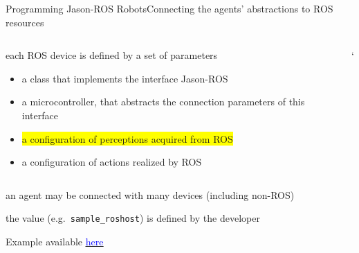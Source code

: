 \documentclass[compress]{beamer}
\newcommand{\link}[2]{\href{#1}{\underline{\textcolor{blue}{#2}}}}
\begin{document}
\begin{frame}[fragile]{Programming Jason-ROS Robots}{Connecting the agents' abstractions to ROS resources}
\begin{columns}
\begin{column}{.55\textwidth}
            each ROS device is defined by a set of parameters
            \begin{itemize}\tiny
                \item a class that implements the interface Jason-ROS
                \item a microcontroller, that abstracts the connection parameters of this interface
                \item\colorbox{yellow}{a configuration of perceptions acquired from ROS}
                \item a configuration of actions realized by ROS
            \end{itemize}
        \end{column}`      
    \end{columns}
  
  
    \vspace{.3cm}
  
    an agent may be connected with many devices {\tiny (including non-ROS)}\\ \vspace{-.2cm}
  
    the value (e.g.~\texttt{sample\_roshost}) is defined by the developer
    
    
     \vfill
    {\tiny Example available \link{https://github.com/issia-2026-jason-ros/turtle-example/blob/master/src/agt/robot1.yaml}{here}}
\end{frame}
\end{document}
